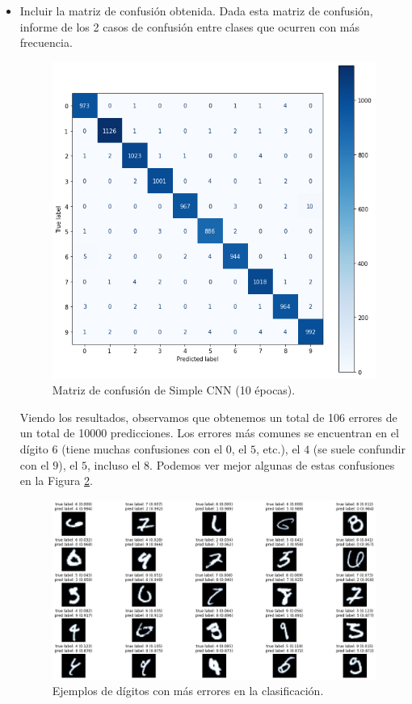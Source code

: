 \documentclass[12pt]{scrartcl}
\begin{document}
\begin{itemize}
    \item Incluir la matriz de confusión obtenida. Dada esta matriz de confusión, informe de los 2 casos de confusión entre clases que ocurren con más frecuencia.
    \begin{figure}[H]
        \centering
        \includegraphics[scale=0.58]{confmatrx1.png}
        \caption{Matriz de confusión de Simple CNN (10 épocas).}
        \label{fig:confmatrx1}
    \end{figure}
    Viendo los resultados, observamos que obtenemos un total de 106 errores de un total de 10000 predicciones. Los errores más comunes se encuentran en el dígito $6$ (tiene muchas confusiones con el $0$, el $5$, etc.), el $4$ (se suele confundir con el $9$), el $5$, incluso el $8$. Podemos ver mejor algunas de estas confusiones en la Figura \ref{fig:errores1}.
    \begin{figure}[H]
        \centering
        \includegraphics[scale=0.42]{mosterror1.png}
        \caption{Ejemplos de dígitos con más errores en la clasificación.}
        \label{fig:errores1}
    \end{figure}
    

\end{itemize}
\end{document}
